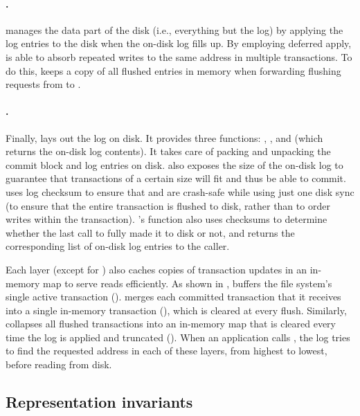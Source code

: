 \paragraph{\memlog.}

\memlog manages the data part of the disk (i.e., everything but the log) by
applying the log entries to the disk when the on-disk log fills up.  By
employing deferred apply, \memlog is able to absorb
repeated writes to the same address in multiple transactions. To do this,
\memlog keeps a copy of all flushed entries in memory when forwarding
flushing requests from \grouplog to \disklog.

\paragraph{\disklog.}

Finally, \disklog lays out the log on disk.  It provides three functions:
, , and  (which returns the on-disk log
contents).  It takes care of packing and unpacking the commit block and log
entries on disk.  \disklog also exposes the size of the on-disk log to
guarantee that transactions of a certain size will fit and thus be able to
commit.  \disklog uses log checksum to ensure that  and
 are crash-safe while using just one disk sync (to ensure that
the entire transaction is flushed to disk, rather than to order writes
within the transaction).  \disklog's  function also uses
checksums to determine whether the last call to  fully made it
to disk or not, and returns the corresponding list of on-disk log entries
to the caller.

Each layer (except for \disklog) also caches copies of transaction updates
in an in-memory map to serve reads efficiently. As shown in ,
\logapi buffers the file system's single active transaction
(). \grouplog merges each committed transaction that it
receives into a single in-memory transaction (), which is
cleared at every flush. Similarly, \memlog collapses all flushed
transactions into an in-memory map that is cleared every time the log is
applied and truncated ().  When an application calls
, the log tries to find the requested address in each of these
layers, from highest to lowest, before reading from disk.

\subsection{Representation invariants}

